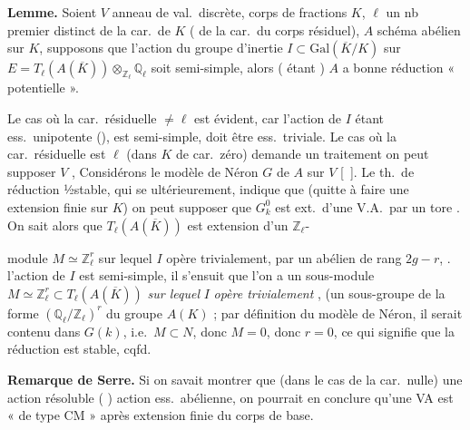 \documentclass[11pt,a4paper]{article}
\begin{document}
\textbf{Lemme.} Soient $V$ anneau de val.\ discrète, corps de fractions $K$, $\ell$ un nb premier distinct de la car.\ de $K$ ( de la car.\ du corps résiduel), $A$ schéma abélien sur $K$, \struck{\ill{}} supposons que l'action du groupe d'inertie \struck{\ill{}} $I \subset \mathrm{Gal}(\overline{K}/K)$ sur $E = T_\ell(A(\overline{K})) \otimes_{\mathbb{Z}_\ell} \mathbb{Q}_\ell$ soit \struck{\ill{}} \add{\ill{}} semi-simple,  alors  \ill{} ( étant ) $A$ a bonne réduction « potentielle ».

Le cas où la car.\ résiduelle $\neq \ell$ est évident, car l'action de $I$ étant ess.\ unipotente (),  est semi-simple,  doit être ess.\ triviale. \struck{\ill{}} Le cas où la car.\ résiduelle est $\ell$ (dans $K$ de car.\ zéro) demande un traitement \uncertain{\ill{}} \struck{\ill{}} \ill{} on peut supposer $V$ \struck{\ill{}},   Considérons le modèle de Néron $G$ de $A$ sur $V$ [~].  Le th.\ de réduction ½stable, qui se  ultérieurement, indique que (quitte à faire une extension finie sur $K$) on peut supposer que $G^0_k$ est ext.\ d'une V.A.\ par un tore . On sait alors que $T_\ell(A(\overline{K}))$ est extension d'un $\mathbb{Z}_\ell$-

module $M \simeq \mathbb{Z}_\ell^r$ \struck{\ill{}} sur lequel $I$ opère trivialement,  par un   abélien de rang $2g-r$, .  l'action  de $I$ est semi-simple, il s'ensuit que l'on a un sous-module $M \simeq \mathbb{Z}_\ell^r \subset T_\ell(A(\overline{K}))$ \emph{sur lequel} $I$ \emph{opère trivialement} \struck{\ill{}},  (un sous-groupe de la forme $(\mathbb{Q}_\ell/\mathbb{Z}_\ell)^r$ du groupe $A(K)$ ; par définition du modèle de Néron, il serait contenu dans $G(k)$, i.e.\ $M \subset N$, donc $M = 0$, donc $r = 0$, ce qui signifie que la réduction est stable, cqfd.

\textbf{Remarque de Serre.} Si on savait montrer que (dans le cas de la car.\ nulle) une action résoluble ( ) action ess.\ abélienne, \ill{} on pourrait en conclure qu'une  VA est « de type CM » après extension finie du corps de base.
\end{document}
